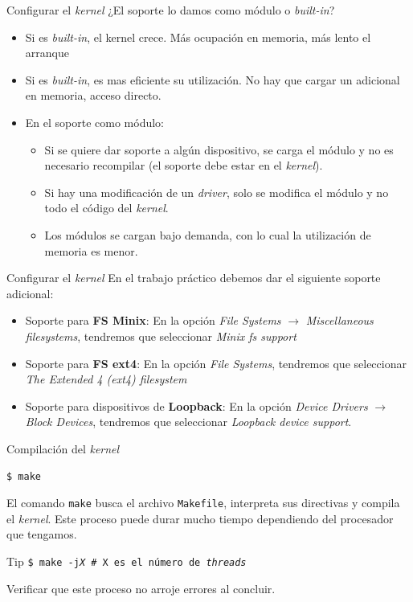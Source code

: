\begin{frame}{Configurar el \textit{kernel}}
¿El soporte lo damos como módulo o \textit{built-in}?
\pause
\begin{itemize}
\item Si es \textit{built-in}, el kernel crece. Más ocupación en memoria, más lento el arranque
\item Si es \textit{built-in}, es mas eficiente su utilización. No hay que
  cargar un adicional en memoria, acceso directo.
\item En el soporte como módulo:
  \begin{itemize}
  \item Si se quiere dar soporte a algún dispositivo, se carga el módulo y
    no es necesario recompilar (el soporte debe estar en el
    \textit{kernel}).

  \item Si hay una modificación de un \textit{driver}, solo se modifica el
    módulo y no todo el código del \textit{kernel}.

  \item Los módulos se cargan bajo demanda, con lo cual la utilización de
    memoria es menor.
  \end{itemize}
\end{itemize}
\end{frame}

\begin{frame}{Configurar el \textit{kernel}}
  En el trabajo práctico debemos dar el siguiente soporte adicional:
  \begin{itemize}

  \item Soporte para \textbf{FS Minix}: En la opción \textit{File Systems}
    $\to$ \textit{Miscellaneous filesystems}, tendremos que seleccionar
    \textit{Minix fs support}

  \item Soporte para \textbf{FS ext4}: En la opción \textit{File Systems},
    tendremos que seleccionar \textit{The Extended 4 (ext4) filesystem}

  \item Soporte para dispositivos de \textbf{Loopback}: En la opción
    \textit{Device Drivers} $\to$ \textit{Block Devices}, tendremos que
    seleccionar \textit{Loopback device support}.
  \end{itemize}
\end{frame}

\begin{frame}{Compilación del \textit{kernel}}
\begin{block}{}
  \texttt{\$ make} 
\end{block}
El comando \texttt{make} busca el archivo \texttt{Makefile}, interpreta sus
directivas y compila el \textit{kernel}. Este proceso puede durar mucho
tiempo dependiendo del procesador que tengamos.

\begin{block}{Tip}
\texttt{\$ make -j\textit{X} \# X es el número de \textit{threads}}
\end{block}

Verificar que este proceso no arroje errores al concluir.
\end{frame}

